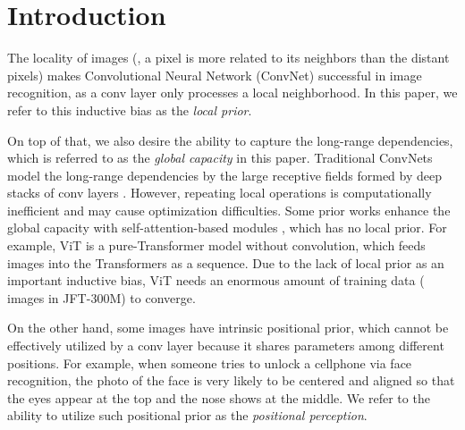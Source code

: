 \documentclass[10pt,twocolumn,letterpaper]{article}
\begin{document}
\section{Introduction}

The locality of images (\ie, a pixel is more related to its neighbors than the distant pixels) makes Convolutional Neural Network (ConvNet) successful in image recognition, as a conv layer only processes a local neighborhood. In this paper, we refer to this inductive bias as the \textit{local prior}.

On top of that, we also desire the ability to capture the long-range dependencies, which is referred to as the \textit{global capacity} in this paper. Traditional ConvNets model the long-range dependencies by the large receptive fields formed by deep stacks of conv layers \cite{wang2018non}. However, repeating local operations is computationally inefficient and may cause optimization difficulties. Some prior works enhance the global capacity with self-attention-based modules \cite{wang2018non,dosovitskiy2020image,vaswani2017attention}, which has no local prior. For example, ViT \cite{dosovitskiy2020image} is a pure-Transformer model without convolution, which feeds images into the Transformers as a sequence. Due to the lack of local prior as an important inductive bias, ViT needs an enormous amount of training data ( images in JFT-300M) to converge.

On the other hand, some images have intrinsic positional prior, which cannot be effectively utilized by a conv layer because it shares parameters among different positions. For example, when someone tries to unlock a cellphone via face recognition, the photo of the face is very likely to be centered and aligned so that the eyes appear at the top and the nose shows at the middle. We refer to the ability to utilize such positional prior as the \textit{positional perception}.
\end{document}
